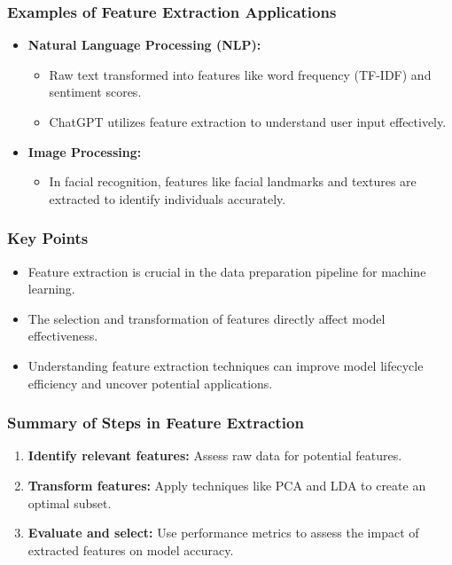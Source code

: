 \documentclass[aspectratio=169]{beamer}
\begin{document}
\begin{frame}[fragile]
    \frametitle{Examples of Feature Extraction Applications}
    \begin{itemize}
        \item \textbf{Natural Language Processing (NLP):}
        \begin{itemize}
            \item Raw text transformed into features like word frequency (TF-IDF) and sentiment scores.
            \item ChatGPT utilizes feature extraction to understand user input effectively.
        \end{itemize}
        
        \item \textbf{Image Processing:}
        \begin{itemize}
            \item In facial recognition, features like facial landmarks and textures are extracted to identify individuals accurately.
        \end{itemize}
    \end{itemize}
\end{frame}

\begin{frame}[fragile]
    \frametitle{Key Points}
    \begin{itemize}
        \item Feature extraction is crucial in the data preparation pipeline for machine learning.
        \item The selection and transformation of features directly affect model effectiveness.
        \item Understanding feature extraction techniques can improve model lifecycle efficiency and uncover potential applications.
    \end{itemize}
\end{frame}

\begin{frame}[fragile]
    \frametitle{Summary of Steps in Feature Extraction}
    \begin{enumerate}
        \item \textbf{Identify relevant features:} Assess raw data for potential features.
        \item \textbf{Transform features:} Apply techniques like PCA and LDA to create an optimal subset.
        \item \textbf{Evaluate and select:} Use performance metrics to assess the impact of extracted features on model accuracy.
    \end{enumerate}
\end{frame}
\end{document}
